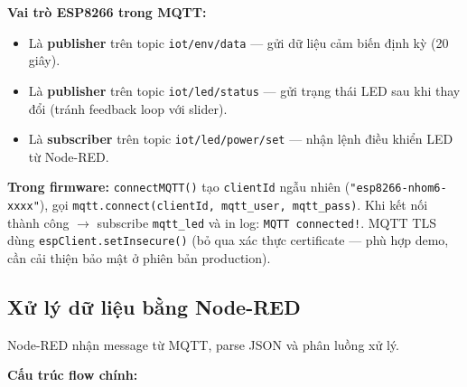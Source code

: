 \documentclass[13pt,a4paper]{article}
\newcommand{\code}[1]{\texttt{#1}}
\begin{document}
\textbf{Vai trò ESP8266 trong MQTT:}
\begin{itemize}
    \item Là \textbf{publisher} trên topic \code{iot/env/data} --- gửi dữ liệu cảm biến định kỳ (20 giây).
    \item Là \textbf{publisher} trên topic \code{iot/led/status} --- gửi trạng thái LED sau khi thay đổi (tránh feedback loop với slider).
    \item Là \textbf{subscriber} trên topic \code{iot/led/power/set} --- nhận lệnh điều khiển LED từ Node-RED.
\end{itemize}

\textbf{Trong firmware:}
\code{connectMQTT()} tạo \code{clientId} ngẫu nhiên (\code{"esp8266-nhom6-xxxx"}), gọi \code{mqtt.connect(clientId, mqtt\_user, mqtt\_pass)}. Khi kết nối thành công $\rightarrow$ subscribe \code{mqtt\_led} và in log: \code{MQTT connected!}. MQTT TLS dùng \code{espClient.setInsecure()} (bỏ qua xác thực certificate --- phù hợp demo, cần cải thiện bảo mật ở phiên bản production).

\subsection{Xử lý dữ liệu bằng Node-RED}
\label{sec:nodered}

Node-RED nhận message từ MQTT, parse JSON và phân luồng xử lý.

\textbf{Cấu trúc flow chính:}
\end{document}
